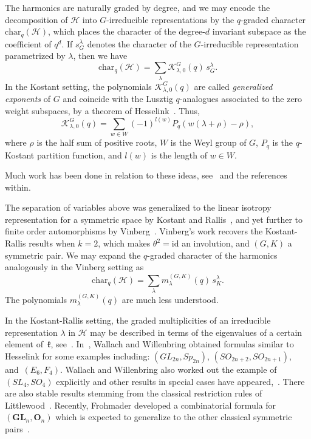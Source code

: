 \documentclass[ALCO,Unicode]{cedram}
\newcommand{\GL}{\textbf{GL}}
\newcommand{\Or}{\textbf{O}}
\begin{document}
The harmonics are naturally graded by degree, and we may encode the decomposition of $\mathcal{H}$ into $G$-irreducible representations by the $q$-graded character $\text{char}_q(\mathcal{H})$, which places the character of the degree-$d$ invariant subspace as the coefficient of $q^d$. If $s^\lambda_G$ denotes the character of the $G$-irreducible representation parametrized by $\lambda$, then we have
\begin{equation*}
    \text{char}_q(\mathcal{H}) = \sum_\lambda \mathcal{K}^G_{\lambda,0}(q) \, s^\lambda_G.
\end{equation*}
In the Kostant setting, the polynomials $\mathcal{K}^G_{\lambda,0}(q)$ are called \textit{generalized exponents} of $G$ and coincide with the Lusztig $q$-analogues associated to the zero weight subspaces, by a theorem of Hesselink~\cite{Hesselink1980}. Thus,
\begin{equation*}
    \mathcal{K}_{\lambda,0}^G(q) = \sum_{w \in W} (-1)^{l(w)}P_q(w(\lambda + \rho)-\rho),
\end{equation*}
where $\rho$ is the half sum of positive roots, $W$ is the Weyl group of $G$, $P_q$ is the $q$-Kostant partition function, and $l(w)$ is the length of $w \in W$.

Much work has been done in relation to these ideas, see~\cite{KwonJang2021, LecouveyLenart2020, NelsenRam2003} and the references within.

The separation of variables above was generalized to the linear isotropy representation for a symmetric space by Kostant and Rallis~\cite{KostantRallis1971}, and yet further to finite order automorphisms by Vinberg~\cite{Vinberg1976}. Vinberg's work recovers the Kostant-Rallis results when $k=2$, which makes $\theta^2 = \text{id}$ an involution, and $(G,K)$ a symmetric pair. We may expand the $q$-graded character of the harmonics analogously in the Vinberg setting as
\begin{equation*}
    \text{char}_q(\mathcal{H}) = \sum_\lambda m^{(G,K)}_{\lambda}(q) \, s^\lambda_K.
\end{equation*}
The polynomials $m^{(G,K)}_{\lambda}(q)$ are much less understood. 

In the Kostant-Rallis setting, the graded multiplicities of an irreducible representation $\lambda$ in $\mathcal{H}$ may be described in terms of the eigenvalues of a certain element of~$\mathfrak{k}$, see~\cite[Theorem 21]{KostantRallis1971}. In~\cite{WallachWillenbring2000}, Wallach and Willenbring obtained formulas similar to Hesselink for some examples including: $(GL_{2n}, Sp_{2n})$, $(SO_{2n+2},SO_{2n+1})$, and~$(E_6, F_4)$. Wallach and Willenbring also worked out the example of $(SL_4, SO_4)$ explicitly and other results in special cases have appeared,~\cite{WillenbringVanGroningen2014, JohnsonWallach1977}. There are also stable results stemming from the classical restriction rules of Littlewood~\cite{HoweTanWillenbring2005, HoweTanWillenbring2008, Littlewood1944, Littlewood1945, Willenbring2002}. Recently, Frohmader developed a combinatorial formula for $(\GL_n, \Or_n)$ which is expected to generalize to the other classical symmetric pairs~\cite{frohmader2023graded}. 
\end{document}
